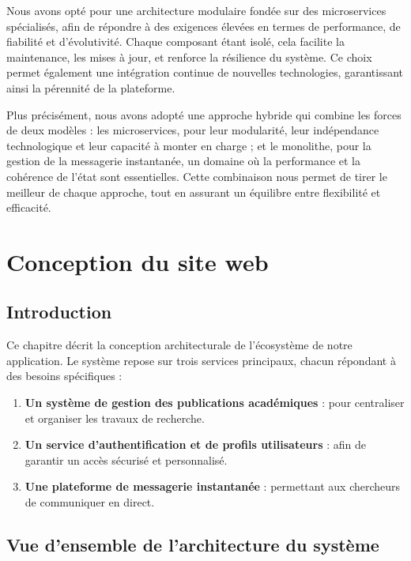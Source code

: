 \documentclass{rapportPfe}
\begin{document}
Nous avons opté pour une architecture modulaire fondée sur des microservices spécialisés, afin de répondre à des exigences élevées en termes de performance, de fiabilité et d’évolutivité. Chaque composant étant isolé, cela facilite la maintenance, les mises à jour, et renforce la résilience du système. Ce choix permet également une intégration continue de nouvelles technologies, garantissant ainsi la pérennité de la plateforme.

Plus précisément, nous avons adopté une approche hybride qui combine les forces de deux modèles : les microservices, pour leur modularité, leur indépendance technologique et leur capacité à monter en charge ; et le monolithe, pour la gestion de la messagerie instantanée, un domaine où la performance et la cohérence de l’état sont essentielles. Cette combinaison nous permet de tirer le meilleur de chaque approche, tout en assurant un équilibre entre flexibilité et efficacité.

\chapter{Conception du site web}

\section{Introduction}

Ce chapitre décrit la conception architecturale de l'écosystème de notre application. Le système repose sur trois services principaux, chacun répondant à des besoins spécifiques :

\begin{enumerate}
    \item \textbf{Un système de gestion des publications académiques} : pour centraliser et organiser les travaux de recherche.
    
    \item \textbf{Un service d’authentification et de profils utilisateurs} : afin de garantir un accès sécurisé et personnalisé.
    
    \item \textbf{Une plateforme de messagerie instantanée} : permettant aux chercheurs de communiquer en direct.
    
\end{enumerate}

\section{Vue d’ensemble de l’architecture du système}
\end{document}
